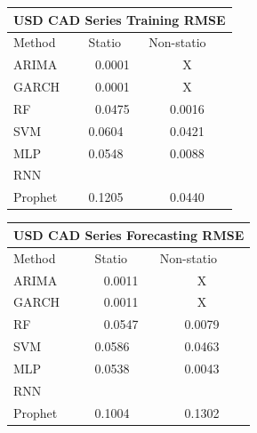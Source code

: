 \documentclass[10pt,twocolumn,letterpaper]{article}
\begin{document}
\begin{table}[h]\label{table:usdcadtrainingRMSE}
	\centering
	\begin{tabular}{|lll|}
		\hline
		\multicolumn{3}{|c|}{USD CAD Series Training RMSE}                                                  \\ \hline
		\multicolumn{1}{|l|}{Method}  & \multicolumn{1}{l|}{Statio} & Non-statio             \\ \hline
		\multicolumn{1}{|l|}{ARIMA}   & \multicolumn{1}{c|}{0.0001}       & \multicolumn{1}{c|}{X} \\ \hline
		\multicolumn{1}{|l|}{GARCH}   & \multicolumn{1}{c|}{0.0001}       & \multicolumn{1}{c|}{X} \\ \hline
		\multicolumn{1}{|l|}{RF}      & \multicolumn{1}{c|}{0.0475}       & \multicolumn{1}{c|}{0.0016}  \\ \hline
		\multicolumn{1}{|l|}{SVM}     & \multicolumn{1}{l|}{0.0604}       & \multicolumn{1}{c|}{0.0421}  \\ \hline
		\multicolumn{1}{|l|}{MLP}     & \multicolumn{1}{l|}{0.0548}       & \multicolumn{1}{c|}{0.0088}  \\ \hline
		\multicolumn{1}{|l|}{RNN}     & \multicolumn{1}{l|}{}       & \multicolumn{1}{c|}{}  \\ \hline
		\multicolumn{1}{|l|}{Prophet} & \multicolumn{1}{l|}{0.1205}       & \multicolumn{1}{c|}{0.0440}  \\ \hline
	\end{tabular}
\end{table}

\begin{table}[h]
	\label{table:usdcadforecastRMSE}
	\centering
	\begin{tabular}{|lll|}
		\hline
		\multicolumn{3}{|c|}{USD CAD Series Forecasting RMSE}                                                  \\ \hline
		\multicolumn{1}{|l|}{Method}  & \multicolumn{1}{l|}{Statio} & Non-statio             \\ \hline
		\multicolumn{1}{|l|}{ARIMA}   & \multicolumn{1}{c|}{0.0011}       & \multicolumn{1}{c|}{X} \\ \hline
		\multicolumn{1}{|l|}{GARCH}   & \multicolumn{1}{c|}{0.0011}       & \multicolumn{1}{c|}{X} \\ \hline
		\multicolumn{1}{|l|}{RF}      & \multicolumn{1}{c|}{0.0547}       & \multicolumn{1}{c|}{0.0079}  \\ \hline
		\multicolumn{1}{|l|}{SVM}     & \multicolumn{1}{l|}{0.0586}       & \multicolumn{1}{c|}{0.0463}  \\ \hline
		\multicolumn{1}{|l|}{MLP}     & \multicolumn{1}{l|}{0.0538}       & \multicolumn{1}{c|}{0.0043}  \\ \hline
		\multicolumn{1}{|l|}{RNN}     & \multicolumn{1}{l|}{}       & \multicolumn{1}{c|}{}  \\ \hline
		\multicolumn{1}{|l|}{Prophet} & \multicolumn{1}{l|}{0.1004}       & \multicolumn{1}{c|}{0.1302}  \\ \hline
	\end{tabular}
\end{table}
\end{document}
